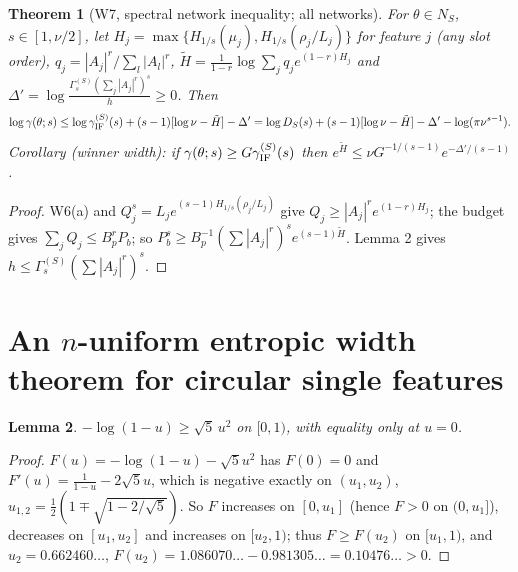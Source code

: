 \documentclass[11pt]{article}
\newtheorem{theorem}{Theorem}\newtheorem{lemma}[theorem]{Lemma}\newtheorem{corollary}[theorem]{Corollary}
\theoremstyle{remark}\newtheorem{remark}[theorem]{Remark}
\newcommand{\Hr}{H_{1/s}}
\begin{document}
\begin{theorem}[W7, spectral network inequality; all networks]\label{W7}
For $\theta\in N_S$, $s\in[1,\nu/2]$, let $H_j=\max\{\Hr(\mu_j),\Hr(\rho_j/L_j)\}$ for feature $j$ (any slot order), $q_j=|A_j|^r/\sum_l|A_l|^r$,
$\tilde H=\frac1{1-r}\log\sum_jq_je^{(1-r)H_j}$ and $\Delta'=\log\frac{\Gamma^{(S)}_s(\sum_j|A_j|^r)^s}{h}\ge0$. Then
\[\log\gamma(\theta;s)\le\log\gamma^{(S)}_{\rm IF}(s)+(s-1)[\log\nu-\tilde H]-\Delta'=\log D_S(s)+(s-1)[\log\nu-\tilde H]-\Delta'-\log(\pi\nu^{s-1}).\]
Corollary (winner width): if $\gamma(\theta;s)\ge G\gamma^{(S)}_{\rm IF}(s)$ then $e^{\tilde H}\le\nu G^{-1/(s-1)}e^{-\Delta'/(s-1)}$.
\end{theorem}
\begin{proof}
W6(a) and $Q_j^s=L_je^{(s-1)\Hr(\rho_j/L_j)}$ give $Q_j\ge|A_j|^re^{(1-r)H_j}$; the budget gives $\sum_jQ_j\le B_p^rP_b$; so
$P_b^s\ge B_p^{-1}(\sum|A_j|^r)^se^{(s-1)\tilde H}$. Lemma 2 gives $h\le\Gamma^{(S)}_s(\sum|A_j|^r)^s$.
\end{proof}

\section{An $n$-uniform entropic width theorem for circular single features}
\begin{lemma}\label{elem}$-\log(1-u)\ge\sqrt5\,u^2$ on $[0,1)$, with equality only at $u=0$.\end{lemma}
\begin{proof}$F(u)=-\log(1-u)-\sqrt5u^2$ has $F(0)=0$ and $F'(u)=\frac1{1-u}-2\sqrt5u$, which is negative exactly on $(u_1,u_2)$,
$u_{1,2}=\frac12(1\mp\sqrt{1-2/\sqrt5})$. So $F$ increases on $[0,u_1]$ (hence $F>0$ on $(0,u_1]$), decreases on $[u_1,u_2]$ and increases on
$[u_2,1)$; thus $F\ge F(u_2)$ on $[u_1,1)$, and $u_2=0.662460\ldots$, $F(u_2)=1.086070\ldots-0.981305\ldots=0.10476\ldots>0$.\end{proof}
\end{document}
